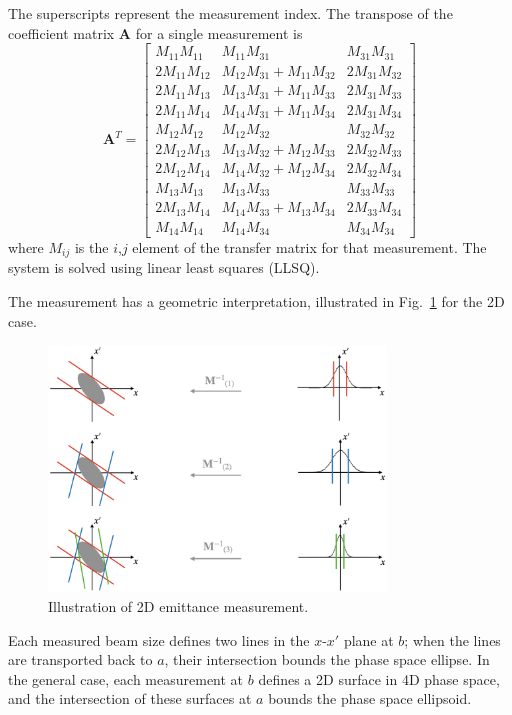 %
The superscripts represent the measurement index. The transpose of the coefficient matrix $\mathbf{A}$ for a single measurement is
%
\begin{equation}
    \mathbf{A}^T = 
    \begin{bmatrix}
        M_{11}M_{11} & M_{11}M_{31} & M_{31}M_{31} \\
        2M_{11}M_{12} & M_{12}M_{31} + M_{11}M_{32} & 2M_{31}M_{32} \\
        2M_{11}M_{13} & M_{13}M_{31} + M_{11}M_{33} & 2M_{31}M_{33} \\
        2M_{11}M_{14} & M_{14}M_{31} + M_{11}M_{34} & 2M_{31}M_{34} \\
        M_{12}M_{12} & M_{12}M_{32} & M_{32}M_{32} \\
        2M_{12}M_{13} & M_{13}M_{32} + M_{12}M_{33} & 2M_{32}M_{33} \\
        2M_{12}M_{14} & M_{14}M_{32} + M_{12}M_{34} & 2M_{32}M_{34} \\
        M_{13}M_{13} & M_{13}M_{33} & M_{33}M_{33} \\
        2M_{13}M_{14} & M_{14}M_{33} + M_{13}M_{34} & 2M_{33}M_{34} \\
        M_{14}M_{14} & M_{14}M_{34} & M_{34}M_{34}
    \end{bmatrix}
\end{equation}
%
where $M_{ij}$ is the $i$,$j$ element of the transfer matrix for that measurement. The system is solved using linear least squares (LLSQ). 

The measurement has a geometric interpretation, illustrated in Fig.~\ref{fig:ws_emittance_measurement} for the 2D case. 
%
\begin{figure}[!p]
    \centering
    \includegraphics[width=0.8\textwidth]{Images/chapter4/ws_emittance_measurement.png}
    \caption{Illustration of 2D emittance measurement.}
    \label{fig:ws_emittance_measurement}
\end{figure}
%
Each measured beam size defines two lines in the $x$-$x'$ plane at $b$; when the lines are transported back to $a$, their intersection bounds the phase space ellipse. In the general case, each measurement at $b$ defines a 2D surface in 4D phase space, and the intersection of these surfaces at $a$ bounds the phase space ellipsoid.


